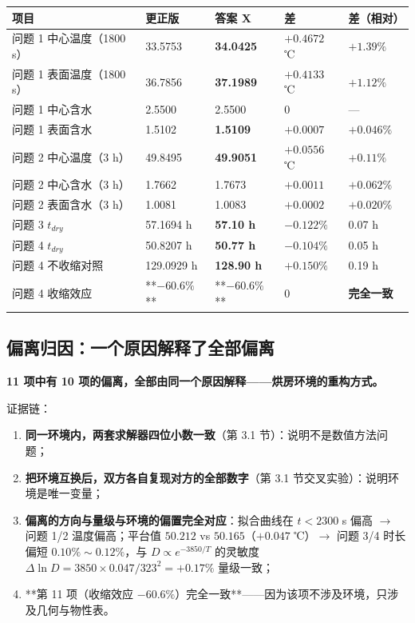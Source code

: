 \begin{center}
\small
\begin{tabular}{lllll}
\toprule
项目 & \textbf{更正版} & 答案 X & 差 & 差（相对） \\
\midrule
问题 1 中心温度（1800 s） & 33.5753 & \textbf{34.0425} & $+0.4672$ ℃ & $+1.39\%$ \\
问题 1 表面温度（1800 s） & 36.7856 & \textbf{37.1989} & $+0.4133$ ℃ & $+1.12\%$ \\
问题 1 中心含水 & 2.5500 & 2.5500 & $0$ & — \\
问题 1 表面含水 & 1.5102 & \textbf{1.5109} & $+0.0007$ & $+0.046\%$ \\
问题 2 中心温度（3 h） & 49.8495 & \textbf{49.9051} & $+0.0556$ ℃ & $+0.11\%$ \\
问题 2 中心含水（3 h） & 1.7662 & 1.7673 & $+0.0011$ & $+0.062\%$ \\
问题 2 表面含水（3 h） & 1.0081 & 1.0083 & $+0.0002$ & $+0.020\%$ \\
问题 3 $t_{dry}$ & 57.1694 h & \textbf{57.10 h} & $-0.122\%$ & 0.07 h \\
问题 4 $t_{dry}$ & 50.8207 h & \textbf{50.77 h} & $-0.104\%$ & 0.05 h \\
问题 4 不收缩对照 & 129.0929 h & \textbf{128.90 h} & $+0.150\%$ & 0.19 h \\
问题 4 收缩效应 & **$-60.6\%$** & **$-60.6\%$** & $0$ & \textbf{完全一致} \\
\bottomrule
\end{tabular}
\end{center}


\subsection{偏离归因：一个原因解释了全部偏离}


\textbf{11 项中有 10 项的偏离，全部由同一个原因解释——烘房环境的重构方式。}


证据链：


\begin{enumerate}
\item \textbf{同一环境内，两套求解器四位小数一致}（第 3.1 节）：说明不是数值方法问题；
\item \textbf{把环境互换后，双方各自复现对方的全部数字}（第 3.1 节交叉实验）：说明环境是唯一变量；
\item \textbf{偏离的方向与量级与环境的偏置完全对应}：拟合曲线在 $t<2300$ s 偏高 $\rightarrow$ 问题 1/2 温度偏高；平台值 $50.212$ vs $50.165$（$+0.047$ ℃）$\rightarrow$ 问题 3/4 时长偏短 $0.10\%\sim0.12\%$，与 $D\propto e^{-3850/T}$ 的灵敏度 $\Delta\ln D=3850\times0.047/323^2=+0.17\%$ 量级一致；
\item **第 11 项（收缩效应 $-60.6\%$）完全一致**——因为该项不涉及环境，只涉及几何与物性表。
\end{enumerate}


